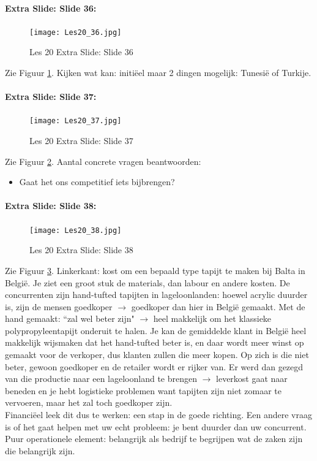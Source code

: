 \documentclass[10pt,a4paper]{report}
\begin{document}
\paragraph{Extra Slide: Slide 36:} 

\begin{figure}[h!]
\centering
\texttt{[image: Les20\_36.jpg]}
\caption{Les 20 Extra Slide: Slide 36} 
\label{les20_36}
\end{figure}

Zie Figuur \ref{les20_36}. Kijken wat kan: initi\"eel maar 2 dingen mogelijk: Tunesi\"e of Turkije. 

\paragraph{Extra Slide: Slide 37:} 

\begin{figure}[h!]
\centering
\texttt{[image: Les20\_37.jpg]}
\caption{Les 20 Extra Slide: Slide 37} 
\label{les20_37}
\end{figure}

Zie Figuur \ref{les20_37}. Aantal concrete vragen beantwoorden:
\begin{itemize}
\item Gaat het ons competitief iets bijbrengen? 
\end{itemize}

\paragraph{Extra Slide: Slide 38:}

\begin{figure}[h!]
\centering
\texttt{[image: Les20\_38.jpg]}
\caption{Les 20 Extra Slide: Slide 38} 
\label{les20_38}
\end{figure}

Zie Figuur \ref{les20_38}. Linkerkant: kost om een bepaald type tapijt te maken bij Balta in Belgi\"e. Je ziet een groot stuk de materials, dan labour en andere kosten. De concurrenten zijn hand-tufted tapijten in lageloonlanden: hoewel acrylic duurder is, zijn de mensen goedkoper $\rightarrow$ goedkoper dan hier in Belgi\"e gemaakt. Met de hand gemaakt: ``zal wel beter zijn" $\rightarrow$ heel makkelijk om het klassieke polypropyleentapijt onderuit te halen. Je kan de gemiddelde klant in Belgi\"e heel makkelijk wijsmaken dat het hand-tufted beter is, en daar wordt meer winst op gemaakt voor de verkoper, dus klanten zullen die meer kopen. Op zich is die niet beter, gewoon goedkoper en de retailer wordt er rijker van. Er werd dan gezegd van die productie naar een lageloonland te brengen $\rightarrow$ leverkost gaat naar beneden en je hebt logistieke problemen want tapijten zijn niet zomaar te vervoeren, maar het zal toch goedkoper zijn.\\
Financi\"eel leek dit dus te werken: een stap in de goede richting. Een andere vraag is of het gaat helpen met uw echt probleem: je bent duurder dan uw concurrent.\\
Puur operationele element: belangrijk als bedrijf te begrijpen wat de zaken zijn die belangrijk zijn. 
\end{document}
